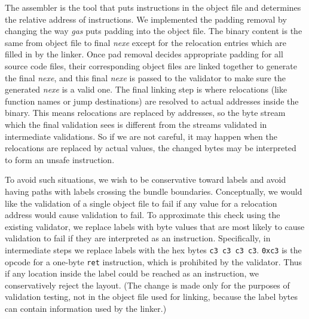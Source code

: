 \documentclass[conference]{IEEEtran}
\begin{document}
The assembler is the tool that puts instructions in the object file and determines the relative address of instructions. 
We implemented the padding removal by changing the way \textit{gas} puts padding into the object file. The binary content is the 
same from object file to final \textit{nexe} except for the relocation entries which are filled in by the linker. Once pad removal 
decides appropriate padding for all source code files, their corresponding object files are linked together to generate the final 
\textit{nexe}, and this final \textit{nexe} is passed to the validator to make sure the generated \textit{nexe} is a valid one. 
The final linking step is where relocations (like function names or jump destinations) are resolved to actual  addresses inside 
the binary. This means relocations are replaced by addresses, so the byte stream which the final validation sees is different from 
the streams validated in intermediate validations. So if we are not careful, it may happen when the relocations are replaced by 
actual values, the changed bytes may be interpreted to form an unsafe instruction. 

To avoid such situations, we wish to be conservative toward labels and avoid having paths with labels crossing the bundle boundaries. 
Conceptually, we would like the validation of a single object file to fail if any value for a relocation address would cause validation to fail.
%
To approximate this check using the existing validator, we replace labels with byte values that are most likely to cause validation to fail if they are interpreted as an instruction.
Specifically, in intermediate steps we replace labels with the hex bytes \texttt{c3 c3 c3 c3}.
\texttt{0xc3} is the opcode for a one-byte \texttt{ret}
instruction, which is prohibited by the validator.
Thus if any location inside the label could be reached as an
instruction, we conservatively reject the layout.
%
(The change is made only for the purposes of validation testing, not
in the object file used for linking, because the label bytes can
contain information used by the linker.)
\end{document}
